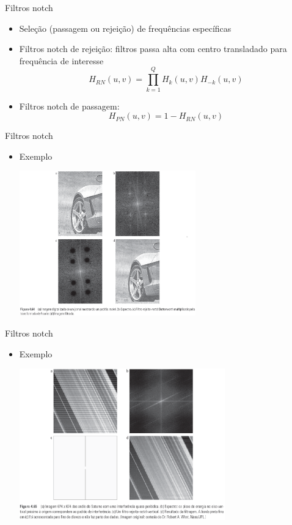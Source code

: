       \begin{slide}[toc=]{Filtros notch}
         \begin{itemize}[type=1]
            \item Seleção (passagem ou rejeição) de frequências específicas
            \item Filtros notch de rejeição: filtros passa alta com centro transladado para 
            frequência de interesse
            \begin{equation*}
               H_{RN}(u,v) = \prod_{k=1}^Q{H_k(u,v)H_{-k}(u,v)}
            \end{equation*}
            \item Filtros notch de passagem:
            \begin{equation*}
               H_{PN}(u,v) = 1-H_{RN}(u,v)
            \end{equation*}
         \end{itemize}
      \end{slide}
      
      \begin{slide}[toc=]{Filtros notch}
         \begin{itemize}[type=1]
            \item Exemplo
		    \begin{center}
            \includegraphics[width=0.6\textwidth]{figs/fig0464}
		    \end{center}
         \end{itemize}
      \end{slide}
      
      \begin{slide}[toc=]{Filtros notch}
         \begin{itemize}[type=1]
            \item Exemplo
		    \begin{center}
            \includegraphics[width=0.7\textwidth]{figs/fig0465}
		    \end{center}
         \end{itemize}
      \end{slide}


